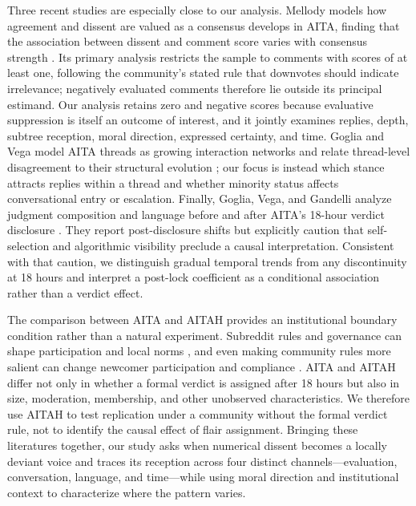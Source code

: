 Three recent studies are especially close to our analysis. Mellody models how agreement and dissent are valued as a consensus develops in AITA, finding that the association between dissent and comment score varies with consensus strength \cite{mellody2025consensus}. Its primary analysis restricts the sample to comments with scores of at least one, following the community's stated rule that downvotes should indicate irrelevance; negatively evaluated comments therefore lie outside its principal estimand. Our analysis retains zero and negative scores because evaluative suppression is itself an outcome of interest, and it jointly examines replies, depth, subtree reception, moral direction, expressed certainty, and time. Goglia and Vega model AITA threads as growing interaction networks and relate thread-level disagreement to their structural evolution \cite{goglia2024structure}; our focus is instead which stance attracts replies within a thread and whether minority status affects conversational entry or escalation. Finally, Goglia, Vega, and Gandelli analyze judgment composition and language before and after AITA's 18-hour verdict disclosure \cite{goglia2026influence}. They report post-disclosure shifts but explicitly caution that self-selection and algorithmic visibility preclude a causal interpretation. Consistent with that caution, we distinguish gradual temporal trends from any discontinuity at 18 hours and interpret a post-lock coefficient as a conditional association rather than a verdict effect.

The comparison between AITA and AITAH provides an institutional boundary condition rather than a natural experiment. Subreddit rules and governance can shape participation and local norms \cite{fiesler2018rules}, and even making community rules more salient can change newcomer participation and compliance \cite{matias2019norms}. AITA and AITAH differ not only in whether a formal verdict is assigned after 18 hours but also in size, moderation, membership, and other unobserved characteristics. We therefore use AITAH to test replication under a community without the formal verdict rule, not to identify the causal effect of flair assignment. Bringing these literatures together, our study asks when numerical dissent becomes a locally deviant voice and traces its reception across four distinct channels---evaluation, conversation, language, and time---while using moral direction and institutional context to characterize where the pattern varies.
